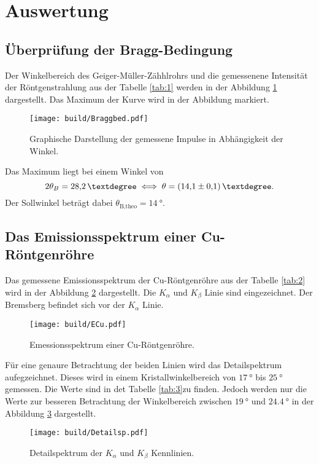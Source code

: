 \section{Auswertung}
\label{sec:Auswertung}

\subsection{Überprüfung der Bragg-Bedingung}
Der Winkelbereich des Geiger-Müller-Zähhlrohrs und die gemessenene Intensität der Röntgenstrahlung aus der Tabelle \ref{tab:1} werden in der Abbildung \ref{fig:Braggb}
dargestellt.
Das Maximum der Kurve wird in der Abbildung markiert. 
\begin{figure}[H]
    \centering
    \texttt{[image: build/Braggbed.pdf]}
    \caption{Graphische Darstellung der gemessene Impulse in Abhängigkeit der Winkel.}
    \label{fig:Braggb}
\end{figure}
\noindent Das Maximum liegt bei einem Winkel von
\begin{equation*}
    2 \theta_B = \qty{28.2}{°} \iff \theta = \qty{14.1 \pm 0.1}{°}.
\end{equation*}
Der Sollwinkel beträgt dabei $\theta_\text{B,theo} = \qty{14}{°}$.


\subsection{Das Emissionsspektrum einer Cu-Röntgenröhre}
Das gemessene Emissionsspektrum der Cu-Röntgenröhre aus der Tabelle \ref{tab:2} wird in der Abbildung \ref{fig:ECu} dargestellt.
Die $K_\alpha$ und $K_\beta$ Linie sind eingezeichnet.
Der Bremsberg befindet sich vor der $K_\alpha$ Linie.
\begin{figure}[H]
    \centering
    \texttt{[image: build/ECu.pdf]}
    \caption{Emessionsspektrum einer Cu-Röntgenröhre.}
    \label{fig:ECu}
\end{figure}

\noindent Für eine genaure Betrachtung der beiden Linien wird das Detailspektrum aufegzeichnet.
Dieses wird in einem Kristallwinkelbereich von $\qty{17}{°}$ bis $\qty{25}{°}$ gemessen.
Die Werte sind in det Tabelle \ref{tab:3}zu finden.
Jedoch werden nur die Werte zur besseren Betrachtung der Winkelbereich zwischen $\qty{19}{°}$ und $\qty{24.4}{°}$ in der Abbildung \ref{fig:Detail} dargestellt.

\begin{figure}[H]
    \centering
    \texttt{[image: build/Detailsp.pdf]}
    \caption{Detailspektrum der $K_\alpha$ und $K_\beta$ Kennlinien.}
    \label{fig:Detail}
\end{figure}

